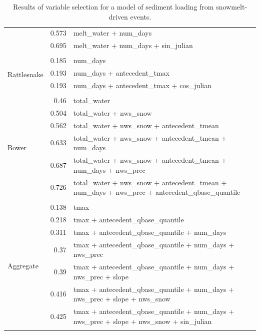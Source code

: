 \documentclass[10pt]{article}
\begin{document}
\begin{table}[h]
\begin{center}
\begin{tabular}{lrl}
 & 0.573 & melt\_water + num\_days\\ 
 & 0.695 & melt\_water + num\_days + sin\_julian\\ 
\vspace{2mm}\\ \multirow{4}{*}{Rattlesnake} & 0.185 & num\_days\\ 
 & 0.193 & num\_days + antecedent\_tmax\\ 
 & 0.193 & num\_days + antecedent\_tmax + cos\_julian\\ 
\vspace{2mm}\\ \multirow{7}{*}{Bower} & 0.46 & total\_water\\ 
 & 0.504 & total\_water + nws\_snow\\ 
 & 0.562 & total\_water + nws\_snow + antecedent\_tmean\\ 
 & 0.633 & total\_water + nws\_snow + antecedent\_tmean + num\_days\\ 
 & 0.687 & total\_water + nws\_snow + antecedent\_tmean + num\_days + nws\_prec\\ 
 & 0.726 & total\_water + nws\_snow + antecedent\_tmean + num\_days + nws\_prec + antecedent\_qbase\_quantile\\ 
\vspace{2mm}\\ \multirow{8}{*}{Aggregate} & 0.138 & tmax\\ 
 & 0.218 & tmax + antecedent\_qbase\_quantile\\ 
 & 0.311 & tmax + antecedent\_qbase\_quantile + num\_days\\ 
 & 0.37 & tmax + antecedent\_qbase\_quantile + num\_days + nws\_prec\\ 
 & 0.39 & tmax + antecedent\_qbase\_quantile + num\_days + nws\_prec + slope\\ 
 & 0.416 & tmax + antecedent\_qbase\_quantile + num\_days + nws\_prec + slope + nws\_snow\\ 
 & 0.425 & tmax + antecedent\_qbase\_quantile + num\_days + nws\_prec + slope + nws\_snow + sin\_julian\\ 
\vspace{2mm}\\     \end{tabular}
    \caption{Results of variable selection for a model of sediment loading from snowmelt-driven events.\label{sed_r_square_snow}}
    \end{center}
\end{table}
\end{document}
